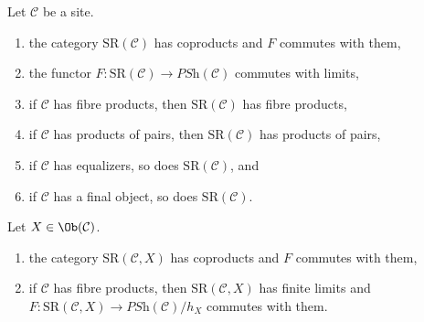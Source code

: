 \begin{lemma}
\label{lemma-coprod-prod-SR}
Let $\mathcal{C}$ be a site.
\begin{enumerate}
\item the category $\text{SR}(\mathcal{C})$ has coproducts
and $F$ commutes with them,
\item the functor $F : \text{SR}(\mathcal{C}) \to \textit{PSh}(\mathcal{C})$
commutes with limits,
\item if $\mathcal{C}$ has fibre products, then $\text{SR}(\mathcal{C})$
has fibre products,
\item if $\mathcal{C}$ has products of pairs, then
$\text{SR}(\mathcal{C})$ has products of pairs,
\item if $\mathcal{C}$ has equalizers, so does $\text{SR}(\mathcal{C})$, and
\item if $\mathcal{C}$ has a final object, so does $\text{SR}(\mathcal{C})$.
\end{enumerate}
Let $X \in \Ob(\mathcal{C})$.
\begin{enumerate}
\item the category $\text{SR}(\mathcal{C}, X)$ has coproducts
and $F$ commutes with them,
\item if $\mathcal{C}$ has fibre products, then $\text{SR}(\mathcal{C}, X)$
has finite limits and
$F : \text{SR}(\mathcal{C}, X) \to \textit{PSh}(\mathcal{C})/h_X$
commutes with them.
\end{enumerate}
\end{lemma}

